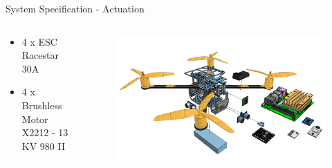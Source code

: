 \begin{frame}{System Specification - Actuation}


    \begin{columns}
        \begin{column}{0.4\textwidth}
        \begin{itemize}
            \item 4 x ESC Racestar 30A
            \item 4 x Brushless Motor X2212 - 13 KV 980 II
        \end{itemize}
        \end{column}
        \begin{column}{0.6\textwidth}  %
            \begin{figure}
                \centering
                \includegraphics[width=1\textwidth]{img/exploded-actuation.png}
                \label{fig:actuation}
            \end{figure}
        \end{column}
    \end{columns}
\end{frame}

